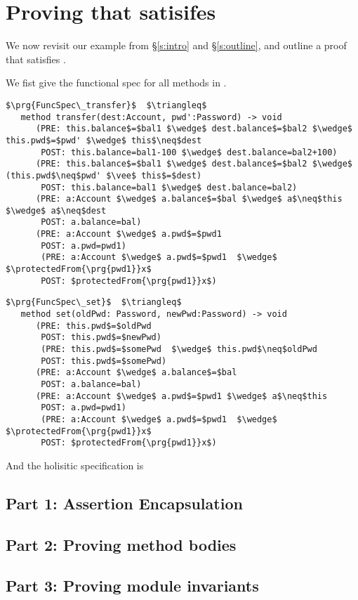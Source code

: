 \section{Proving that \ModC satisifes \SrobustB}
\label{s:examples}
We now revisit our example from  \S  \ref{s:intro} and \S \ref{s:outline},
and outline a proof that \ModC satisfies \SrobustB. 

We fist give the functional spec for all methods in \ModC.
 
\begin{lstlisting}[mathescape=true,xleftmargin=2em,frame=lines,framexleftmargin=1.5em, language=Chainmail]
$\prg{FuncSpec\_transfer}$  $\triangleq$
   method transfer(dest:Account, pwd':Password) -> void  
      (PRE: this.balance$=$bal1 $\wedge$ dest.balance$=$bal2 $\wedge$ this.pwd$=$pwd' $\wedge$ this$\neq$dest
       POST: this.balance=bal1-100 $\wedge$ dest.balance=bal2+100)
      (PRE: this.balance$=$bal1 $\wedge$ dest.balance$=$bal2 $\wedge$ (this.pwd$\neq$pwd' $\vee$ this$=$dest)
       POST: this.balance=bal1 $\wedge$ dest.balance=bal2)
      (PRE: a:Account $\wedge$ a.balance$=$bal $\wedge$ a$\neq$this $\wedge$ a$\neq$dest 
       POST: a.balance=bal)          
      (PRE: a:Account $\wedge$ a.pwd$=$pwd1  
       POST: a.pwd=pwd1)
       (PRE: a:Account $\wedge$ a.pwd$=$pwd1  $\wedge$ $\protectedFrom{\prg{pwd1}}x$
       POST: $protectedFrom{\prg{pwd1}}x$)         
\end{lstlisting}

\begin{lstlisting}[mathescape=true,xleftmargin=2em,frame=lines,framexleftmargin=1.5em, language=Chainmail]
$\prg{FuncSpec\_set}$  $\triangleq$
   method set(oldPwd: Password, newPwd:Password) -> void  
      (PRE: this.pwd$=$oldPwd  
       POST: this.pwd$=$newPwd)
       (PRE: this.pwd$=$somePwd  $\wedge$ this.pwd$\neq$oldPwd 
       POST: this.pwd$=$somePwd)
      (PRE: a:Account $\wedge$ a.balance$=$bal  
       POST: a.balance=bal)          
      (PRE: a:Account $\wedge$ a.pwd$=$pwd1 $\wedge$ a$\neq$this
       POST: a.pwd=pwd1)
       (PRE: a:Account $\wedge$ a.pwd$=$pwd1  $\wedge$ $\protectedFrom{\prg{pwd1}}x$
       POST: $protectedFrom{\prg{pwd1}}x$)         
\end{lstlisting}

And the holisitic specification is



\subsection{Part 1: Assertion Encapsulation}
\label{s:BA-encap}


\subsection{Part 2: Proving method bodies}
\label{s:BA-bodies}

\subsection{Part 3: Proving module invariants}
\label{s:BA-modules}
